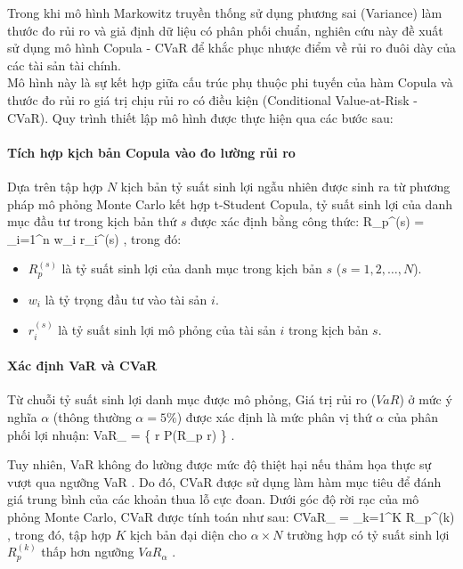 Trong khi mô hình Markowitz truyền thống sử dụng phương sai (Variance) làm thước đo rủi ro và giả định dữ liệu có phân phối chuẩn, nghiên cứu này đề xuất sử dụng mô hình Copula - CVaR để khắc phục nhược điểm về rủi ro đuôi dày của các tài sản tài chính.\\
Mô hình này là sự kết hợp giữa cấu trúc phụ thuộc phi tuyến của hàm Copula và thước đo rủi ro giá trị chịu rủi ro có điều kiện (Conditional Value-at-Risk - CVaR). Quy trình thiết lập mô hình được thực hiện qua các bước sau:

\paragraph{Tích hợp kịch bản Copula vào đo lường rủi ro}

Dựa trên tập hợp $N$ kịch bản tỷ suất sinh lợi ngẫu nhiên được sinh ra từ phương pháp mô phỏng Monte Carlo kết hợp t-Student Copula, tỷ suất sinh lợi của danh mục đầu tư trong kịch bản thứ $s$ được xác định bằng công thức:
\bea
R_p^{(s)} = \sum_{i=1}^{n} w_i r_i^{(s)} ,
\eea
trong đó:
\begin{itemize}
    \item $R_p^{(s)}$ là tỷ suất sinh lợi của danh mục trong kịch bản $s$ ($s = 1, 2, \dots, N$).
    \item $w_i$ là tỷ trọng đầu tư vào tài sản $i$.
    \item $r_i^{(s)}$ là tỷ suất sinh lợi mô phỏng của tài sản $i$ trong kịch bản $s$.
\end{itemize}

\paragraph{Xác định VaR và CVaR}

Từ chuỗi tỷ suất sinh lợi danh mục được mô phỏng, Giá trị rủi ro ($VaR$) ở mức ý nghĩa $\alpha$ (thông thường $\alpha = 5\%$) được xác định là mức phân vị thứ $\alpha$ của phân phối lợi nhuận:
\bea
VaR_{\alpha} = \inf \{ r \in {} \mid P(R_p \le r) \ge \alpha \} .
\eea

Tuy nhiên, VaR không đo lường được mức độ thiệt hại nếu thảm họa thực sự vượt qua ngưỡng VaR \cite{jorion2006value}. Do đó, CVaR được sử dụng làm hàm mục tiêu để đánh giá trung bình của các khoản thua lỗ cực đoan. Dưới góc độ rời rạc của mô phỏng Monte Carlo, CVaR được tính toán như sau:
\bea
CVaR_{\alpha} =  \sum_{k=1}^{K} R_p^{(k)} ,
\eea
trong đó, tập hợp $K$ kịch bản đại diện cho $\alpha \times N$ trường hợp có tỷ suất sinh lợi $R_p^{(k)}$ thấp hơn ngưỡng $VaR_{\alpha}$ \cite{acerbi2002coherence}.

